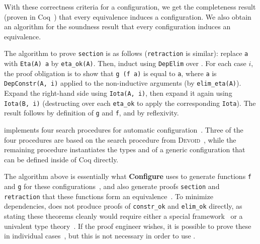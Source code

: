 With these correctness criteria for a configuration, we get the completeness result (proven in Coq~\href{https://github.com/uwplse/pumpkin-pi/blob/v2.0.0/plugin/coq/playground/arbitrary.v}{}) that every equivalence induces a configuration. %
We also obtain an algorithm for the soundness result that every configuration induces an equivalence.

The algorithm to prove \lstinline{section} is as follows (\lstinline{retraction} is similar):
replace \lstinline{a} with \lstinline{Eta(A) a} by \lstinline{eta_ok(A)}.
Then, induct using \lstinline{DepElim} over \A.
For each case $i$, the proof obligation is to show that \lstinline{g (f a)} is equal to \lstinline{a},
where \lstinline{a} is \lstinline{DepConstr(A, i)} applied to the non-inductive arguments (by \lstinline{elim_eta(A)}).
Expand the right-hand side using \lstinline{Iota(A, i)}, then expand it again using \lstinline{Iota(B, i)}
(destructing over each \lstinline{eta_ok} to apply the corresponding \lstinline{Iota}).
The result follows by definition of \lstinline{g} and \lstinline{f}, and by reflexivity.

\toolname implements four search procedures for automatic configuration~\href{https://github.com/uwplse/pumpkin-pi/blob/v2.0.0/plugin/src/automation/lift/liftconfig.ml}{}.
Three of the four procedures are based on the search procedure from 
\textsc{Devoid}~\cite{Ringer2019},
while the remaining procedure instantiates the types \A and \B of a generic configuration that can be defined inside of Coq directly.

The algorithm above is essentially what \textbf{Configure} uses to generate functions \lstinline{f} and \lstinline{g} for these configurations~\href{https://github.com/uwplse/pumpkin-pi/blob/v2.0.0/plugin/src/automation/search/search.ml}{}, %
and also generate proofs \lstinline{section} and \lstinline{retraction} that these functions form an equivalence~\href{https://github.com/uwplse/pumpkin-pi/blob/v2.0.0/plugin/src/automation/search/equivalence.ml}{}. %
To minimize dependencies, \toolname does not produce proofs of \lstinline{constr_ok} and \lstinline{elim_ok} directly,
as stating these theorems cleanly would require either a special framework~\cite{tabareau2017equivalences}
or a univalent type theory~\cite{univalent2013homotopy}.
If the proof engineer wishes, it is possible to prove these in individual cases~\href{https://github.com/uwplse/pumpkin-pi/blob/v2.0.0/plugin/coq/playground/arbitrary.v}{}, %
but this is not necessary in order to use \toolname. %

